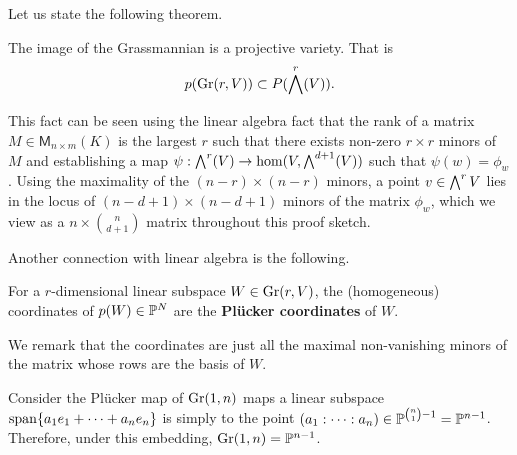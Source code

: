             Let us state the following theorem.
            \begin{theorem}
            \label{thm:grassmannian-is-projective-variety}
                The image of the Grassmannian is a projective variety.
                That is 
                \[
                p(\gr(r, V)) \subset P(\bw^r(V)).
                \]
            \end{theorem}
            This fact can be seen using the linear algebra fact that the rank of a matrix $M \in \mathsf{M}_{n\times m}(K)$ is the largest $r$ such that there exists non-zero $r \times r$ minors of $M$ and establishing a map $\psi: \bw^r(V) \rightarrow \hom(V, \bw^{d+1}(V))$ 
            such that $\psi(w) = \phi_w$.
            Using the maximality of the $(n - r) \times (n - r)$ minors, 
            a point $v \in \bw^r V$ lies in the locus of $(n - d + 1) \times (n - d + 1)$ minors of the matrix $\phi_w$, 
            which we view as a $n \times \binom{n}{d+1}$ matrix throughout this proof sketch.
            
            Another connection with linear algebra is the following.
            \begin{definition}
            \label{def:plucker-coordinates}
                For a $r$-dimensional linear subspace $W \in \gr(r, V)$,
                the (homogeneous) coordinates of $p(W) \in \P^N$
                are the \textbf{Pl\"{u}cker coordinates} of $W$. 
            \end{definition}
            We remark that the coordinates are just 
            all the maximal non-vanishing minors of the matrix 
            whose rows are the basis of $W$. 
            
            \begin{example}
            \label{ex:plucker-coordinates-example-1}
                Consider the Pl\"{u}cker map of $\gr(1, n)$ maps a linear subspace $\vecspan{a_1 e_1 + \cdots + a_n e_n}$ is simply
                to the point $(a_1: \cdots : a_n) \in \P^{\binom{n}{1} - 1} = \P^{n-1}$. 
                Therefore, under this embedding, 
                $\gr(1, n) = \P^{n-1}$.  
            \end{example}
            

